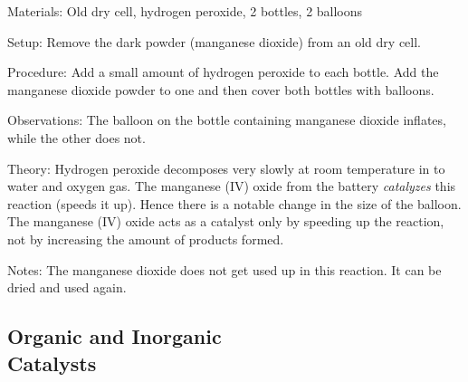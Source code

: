 \begin{multicols}{2}
\begin{description*}
\item[Materials:]{Old dry cell, hydrogen peroxide, 2 bottles, 2 balloons}
\item[Setup:]{Remove the dark powder (manganese dioxide) from an old dry cell.}
\item[Procedure:]{Add a small amount of hydrogen peroxide to each bottle. Add the manganese dioxide powder to one and then cover both bottles with balloons.}
\item[Observations:]{The balloon on the bottle containing manganese dioxide inflates, while the other does not.}
\item[Theory:]{Hydrogen peroxide decomposes very slowly at room temperature in to water and oxygen gas. The manganese (IV) oxide from the battery \emph{catalyzes} this reaction (speeds it up). Hence there is a notable change in the size of the balloon. The manganese (IV) oxide acts as a catalyst only by speeding up the reaction, not by increasing the amount of products formed.}
\item[Notes:]{The manganese dioxide does not get used up in this reaction. It can be dried and used again.}
\end{description*}

\columnbreak

\subsection[Organic and Inorganic Catalysts]{Organic and Inorganic \hfill \\ Catalysts} %



\end{multicols}
